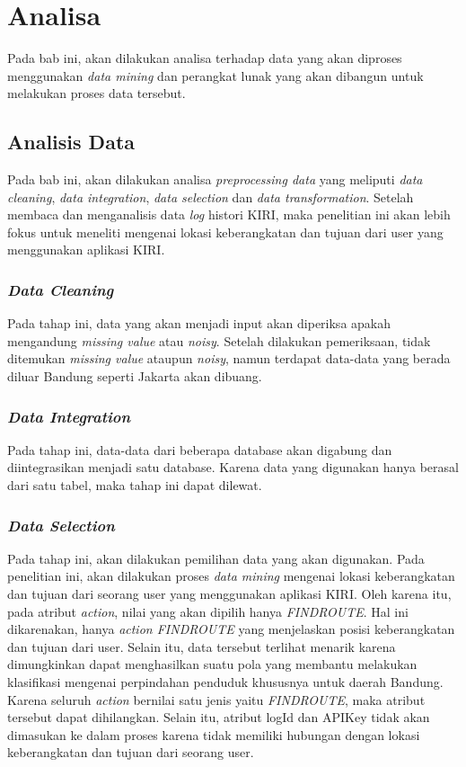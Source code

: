 \chapter{Analisa}

Pada bab ini, akan dilakukan analisa terhadap data yang akan diproses menggunakan \textsl{data mining} dan perangkat lunak yang akan dibangun untuk melakukan proses data tersebut.

\section{Analisis Data}
\label{analisisData}
Pada bab ini, akan dilakukan analisa \textsl{preprocessing data} yang meliputi \textsl{data cleaning}, \textsl{data integration}, \textsl{data selection} dan \textsl{data transformation}. Setelah membaca dan menganalisis data \textsl{log} histori KIRI, maka penelitian ini akan lebih fokus untuk meneliti mengenai lokasi keberangkatan dan tujuan dari user yang menggunakan aplikasi KIRI.

\subsection{\textsl{Data Cleaning}}
Pada tahap ini, data yang akan menjadi input akan diperiksa apakah mengandung \textsl{missing value} atau \textsl{noisy}. Setelah dilakukan pemeriksaan, tidak ditemukan \textsl{missing value} ataupun \textsl{noisy}, namun terdapat data-data yang berada diluar Bandung seperti Jakarta akan dibuang.

\subsection{\textsl{Data Integration}}
Pada tahap ini, data-data dari beberapa database akan digabung dan diintegrasikan menjadi satu database. Karena data yang digunakan hanya berasal dari satu tabel, maka tahap ini dapat dilewat.

\subsection{\textsl{Data Selection}}
Pada tahap ini, akan dilakukan pemilihan data yang akan digunakan. Pada penelitian ini, akan dilakukan proses \textsl{data mining} mengenai lokasi keberangkatan dan tujuan dari seorang user yang menggunakan aplikasi KIRI. Oleh karena itu, pada atribut \textsl{action}, nilai yang akan dipilih hanya \textsl{FINDROUTE}. Hal ini dikarenakan, hanya \textsl{action FINDROUTE} yang menjelaskan posisi keberangkatan dan tujuan dari user. Selain itu, data tersebut terlihat menarik karena dimungkinkan dapat menghasilkan suatu pola yang membantu melakukan klasifikasi mengenai perpindahan penduduk khususnya untuk daerah Bandung. Karena seluruh \textsl{action} bernilai satu jenis yaitu \textsl{FINDROUTE}, maka atribut tersebut dapat dihilangkan. Selain itu, atribut logId dan APIKey tidak akan dimasukan ke dalam proses karena tidak memiliki hubungan dengan lokasi keberangkatan dan tujuan dari seorang user.

